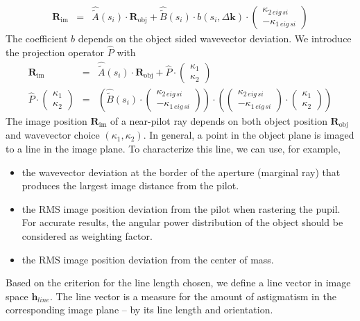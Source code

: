 \documentclass[12pt,a4paper,twoside,openright,BCOR10mm,headsepline,titlepage,abstracton,chapterprefix,final]{scrreprt}
\newcommand\Vector[1]{{\mathbf{#1}}}
\newcommand\wavenumber{k}
\newcommand\Wavevector{\Vector{\wavenumber}}
\newcommand\im{\textrm{im}}
\newcommand\obj{\textrm{obj}}
\begin{document}
\begin{eqnarray}
 \Vector{R}_\im &=& \hat{\tilde{A}}(s_i) \cdot \Vector{R}_\obj + \hat{\tilde{B}}(s_i) \cdot b(s_i,\Delta\Wavevector) \cdot \begin{pmatrix} \kappa_{2\,eig\,si} \\ - \kappa_{1\,eig\,si} \end{pmatrix}
\end{eqnarray}
The coefficient $b$ depends on the object sided wavevector deviation.
We introduce the projection operator $\hat{P}$ with
\begin{eqnarray}
 \Vector{R}_\im &=& \hat{\tilde{A}}(s_i) \cdot \Vector{R}_\obj + \hat{P} \cdot \begin{pmatrix} \kappa_{1} \\ \kappa_{2} \end{pmatrix} \\
 \hat{P} \cdot \begin{pmatrix} \kappa_{1} \\ \kappa_{2} \end{pmatrix} &=& 
    \left( \hat{\tilde{B}}(s_i) \cdot \begin{pmatrix} \kappa_{2\,eig\,si} \\ - \kappa_{1\,eig\,si} \end{pmatrix} \right) 
    \cdot
    \left( \begin{pmatrix} \kappa_{2\,eig\,si} \\ - \kappa_{1\,eig\,si} \end{pmatrix} \cdot \begin{pmatrix} \kappa_{1} \\ \kappa_{2} \end{pmatrix} \right)
\end{eqnarray}
The image position $\Vector{R}_\im$ of a near-pilot ray depends on both object position $\Vector{R}_\obj$ and wavevector choice $(\kappa_1,\kappa_2)$.
In general, a point in the object plane is imaged to a line in the image plane.
To characterize this line, we can use, for example,
\begin{itemize}
 \item the wavevector deviation at the border of the aperture (marginal ray) that produces the largest image distance from the pilot.
 \item the RMS image position deviation from the pilot when rastering the pupil.
       For accurate results, the angular power distribution of the object should be considered as weighting factor.
 \item the RMS image position deviation from the center of mass.
\end{itemize}
Based on the criterion for the line length chosen, we define a line vector in image space $\Vector{h}_{line}$.
The line vector is a measure for the amount of astigmatism in the corresponding image plane -- by its line length and orientation.
\end{document}
